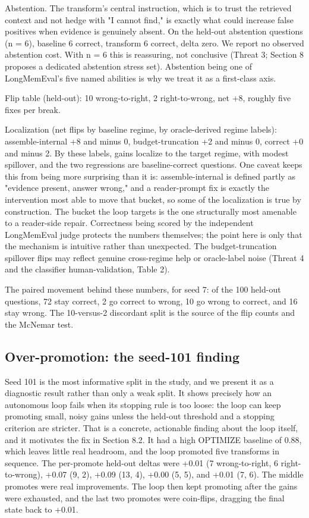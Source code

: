Abstention. The transform's central instruction, which is to trust the retrieved context and not hedge with "I cannot find," is exactly what could increase false positives when evidence is genuinely absent. On the held-out abstention questions (n = 6), baseline 6 correct, transform 6 correct, delta zero. We report no observed abstention cost. With n = 6 this is reassuring, not conclusive (Threat 3; Section 8 proposes a dedicated abstention stress set). Abstention being one of LongMemEval's five named abilities \citep{wu2024longmemeval} is why we treat it as a first-class axis.

Flip table (held-out): 10 wrong-to-right, 2 right-to-wrong, net +8, roughly five fixes per break.

Localization (net flips by baseline regime, by oracle-derived regime labels): assemble-internal +8 and minus 0, budget-truncation +2 and minus 0, correct +0 and minus 2. By these labels, gains localize to the target regime, with modest spillover, and the two regressions are baseline-correct questions. One caveat keeps this from being more surprising than it is: assemble-internal is defined partly as "evidence present, answer wrong," and a reader-prompt fix is exactly the intervention most able to move that bucket, so some of the localization is true by construction. The bucket the loop targets is the one structurally most amenable to a reader-side repair. Correctness being scored by the independent LongMemEval judge protects the numbers themselves; the point here is only that the mechanism is intuitive rather than unexpected. The budget-truncation spillover flips may reflect genuine cross-regime help or oracle-label noise (Threat 4 and the classifier human-validation, Table 2).

The paired movement behind these numbers, for seed 7: of the 100 held-out questions, 72 stay correct, 2 go correct to wrong, 10 go wrong to correct, and 16 stay wrong. The 10-versus-2 discordant split is the source of the flip counts and the McNemar test.

\subsection{Over-promotion: the seed-101 finding}

Seed 101 is the most informative split in the study, and we present it as a diagnostic result rather than only a weak split. It shows precisely how an autonomous loop fails when its stopping rule is too loose: the loop can keep promoting small, noisy gains unless the held-out threshold and a stopping criterion are stricter. That is a concrete, actionable finding about the loop itself, and it motivates the fix in Section 8.2. It had a high OPTIMIZE baseline of 0.88, which leaves little real headroom, and the loop promoted five transforms in sequence. The per-promote held-out deltas were +0.01 (7 wrong-to-right, 6 right-to-wrong), +0.07 (9, 2), +0.09 (13, 4), +0.00 (5, 5), and +0.01 (7, 6). The middle promotes were real improvements. The loop then kept promoting after the gains were exhausted, and the last two promotes were coin-flips, dragging the final state back to +0.01.

